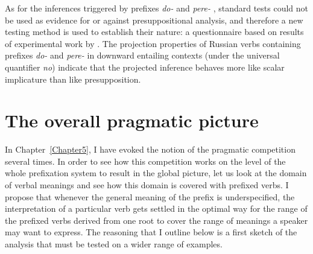 As for the inferences triggered by prefixes \textit{do-}   and \textit{pere-}  , standard tests could not be used as evidence for or against presuppositional analysis, and therefore a new testing method is used to establish their nature: a questionnaire based on results of experimental work by \citet{Chemla:09}.
The projection properties of Russian verbs containing prefixes \textit{do-}   and \textit{pere-}   in downward entailing contexts   (under the universal quantifier \textit{no}) indicate that the projected inference behaves more like scalar implicature than like presupposition.


\section{The overall pragmatic picture}\label{section:pragm:overall}
In Chapter~\ref{Chapter5}, I have evoked the notion of the pragmatic competition several times. In order to see how this competition works on the level of the whole prefixation  system to result in the global picture, let us look at the domain of verbal meanings and see how this domain is covered with prefixed verbs. I propose that whenever the general meaning of the prefix is underspecified, the interpretation of a particular verb gets settled in the optimal way for the range of the prefixed verbs derived from one root to cover the range of meanings a speaker may want to express. The reasoning that I outline below is a first sketch of the analysis that must be tested on a wider range of examples.


